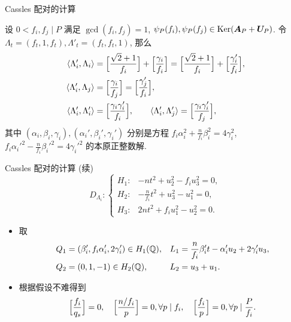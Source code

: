 \documentclass[aspectratio=169,handout]{ctexbeamer}
\renewcommand\aleg[2]{\Bigl[\dfrac{{#1}}{#2}\Bigr]}
\begin{document}
\begin{frame}{Cassles 配对的计算}
  \begin{proposition}
    设 $0<f_i,f_j\mid P$ 满足 $\gcd(f_i,f_j)=1$, $\psi_P(f_i),\psi_P(f_j)\in \operatorname{Ker}({\boldsymbol{A}}_P+{\boldsymbol{U}}_P)$.
    令 $\Lambda_t=(f_t,1,f_t), \Lambda'_t=(f_t,f_t,1)$,
    那么
    \begin{align*}
      \pair{\Lambda_i',\Lambda_i}&=\aleg{\sqrt2+1}{f_i}+\aleg{\gamma_i}{f_i}=\aleg{\sqrt2+1}{f_i}+\aleg{\gamma_i'}{f_i},\\
      \pair{\Lambda_i',\Lambda_j}&=\aleg{\gamma_i}{f_j}=\aleg{\gamma_j'}{f_i},\\
      \pair{\Lambda_i',\Lambda_i'}&=\aleg{\gamma_i\gamma_i'}{f_i},\qquad
      \pair{\Lambda_i',\Lambda_j'}=\aleg{\gamma_i\gamma_i'}{f_j},
    \end{align*}
    其中 $(\alpha_i,\beta_i,\gamma_i),(\alpha_i',\beta_i',\gamma_i')$ 分别是方程 $f_i\alpha_i^2+\frac n{f_i}\beta_i^2=4\gamma_i^2$, $f_i\alpha_i'^2-\frac n{f_i}\beta_i'^2=4\gamma_i'^2$ 的本原正整数解.
  \end{proposition}
\end{frame}


\begin{frame}{Cassles 配对的计算 (续)}  
  \[
    D_{\Lambda_i}:
    \begin{cases}
      H_1:& -nt^2+u_2^2-f_iu_3^2=0,\\
      H_2:& -\frac n{f_i} t^2+u_3^2-u_1^2=0,\\
      H_3:& 2nt^2+f_iu_1^2-u_2^2=0.
    \end{cases}
  \]
  \begin{itemize}
    \item 取
    \begin{align*}
      Q_1&=(\beta_i',f_i\alpha_i',2\gamma_i')\in H_1({\mathbb{Q}}),&
      L_1&=\frac{n}{f_i}\beta_i' t-\alpha_i' u_2+2\gamma_i' u_3,\\
      Q_2&=(0,1,-1)\in H_2({\mathbb{Q}}),&
      L_2&=u_3+u_1.
    \end{align*}
    \item 根据假设不难得到
    \[
      \aleg{f_i}{q_s}=0,\quad
      \aleg{n/f_i}{p}=0,\forall p\mid f_i,\quad
      \aleg{f_i}{p}=0,\forall p\mid \frac{P}{f_i}.
    \]
  \end{itemize}
\end{frame}
\end{document}
